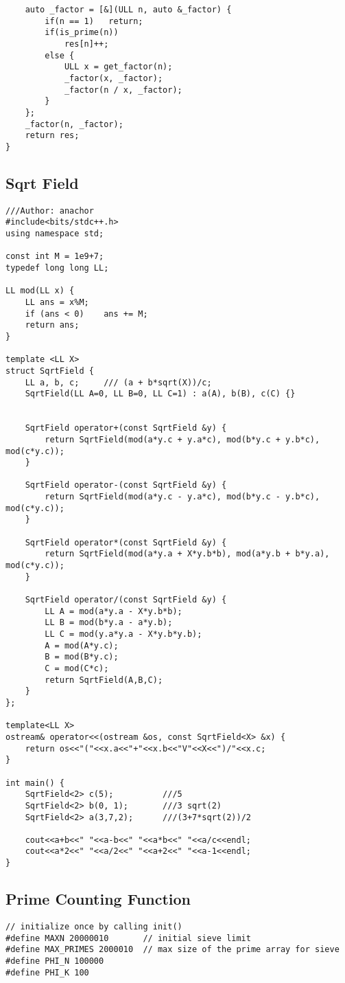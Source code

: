 \documentclass[10pt,a4paper,onesided]{article}
\begin{document}
\begin{multicols*}{3}
\begin{lstlisting}
    auto _factor = [&](ULL n, auto &_factor) {
        if(n == 1)   return;
        if(is_prime(n)) 
            res[n]++;
        else {
            ULL x = get_factor(n);
            _factor(x, _factor);
            _factor(n / x, _factor);
        }
    };
    _factor(n, _factor);
    return res;
}
\end{lstlisting}
\subsection{Sqrt Field}
\begin{lstlisting}
///Author: anachor
#include<bits/stdc++.h>
using namespace std;

const int M = 1e9+7;
typedef long long LL;

LL mod(LL x) {
    LL ans = x%M;
    if (ans < 0)    ans += M;
    return ans;
}

template <LL X>
struct SqrtField {
    LL a, b, c;     /// (a + b*sqrt(X))/c;
    SqrtField(LL A=0, LL B=0, LL C=1) : a(A), b(B), c(C) {}


    SqrtField operator+(const SqrtField &y) {
        return SqrtField(mod(a*y.c + y.a*c), mod(b*y.c + y.b*c), mod(c*y.c));
    }

    SqrtField operator-(const SqrtField &y) {
        return SqrtField(mod(a*y.c - y.a*c), mod(b*y.c - y.b*c), mod(c*y.c));
    }

    SqrtField operator*(const SqrtField &y) {
        return SqrtField(mod(a*y.a + X*y.b*b), mod(a*y.b + b*y.a), mod(c*y.c));
    }

    SqrtField operator/(const SqrtField &y) {
        LL A = mod(a*y.a - X*y.b*b);
        LL B = mod(b*y.a - a*y.b);
        LL C = mod(y.a*y.a - X*y.b*y.b);
        A = mod(A*y.c);
        B = mod(B*y.c);
        C = mod(C*c);
        return SqrtField(A,B,C);
    }
};

template<LL X>
ostream& operator<<(ostream &os, const SqrtField<X> &x) {
    return os<<"("<<x.a<<"+"<<x.b<<"V"<<X<<")/"<<x.c;
}

int main() {
    SqrtField<2> c(5);          ///5
    SqrtField<2> b(0, 1);       ///3 sqrt(2)
    SqrtField<2> a(3,7,2);      ///(3+7*sqrt(2))/2

    cout<<a+b<<" "<<a-b<<" "<<a*b<<" "<<a/c<<endl;
    cout<<a*2<<" "<<a/2<<" "<<a+2<<" "<<a-1<<endl;
}
\end{lstlisting}
\subsection{Prime Counting Function}
\begin{lstlisting}
// initialize once by calling init()
#define MAXN 20000010       // initial sieve limit
#define MAX_PRIMES 2000010  // max size of the prime array for sieve
#define PHI_N 100000
#define PHI_K 100


\end{lstlisting}
\end{multicols*}
\end{document}
